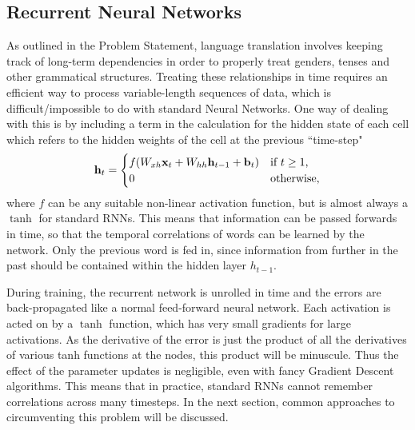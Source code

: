 \documentclass[]{article}
\begin{document}
\subsection{Recurrent Neural Networks}
As outlined in the Problem Statement, language translation involves keeping track of long-term dependencies in order to properly treat genders, tenses and other grammatical structures. Treating these relationships in time requires an efficient way to process variable-length sequences of data, which is difficult/impossible to do with standard Neural Networks. One way of dealing with this is by including a term in the calculation for the hidden state of each cell which refers to the hidden weights of the cell at the previous ``time-step"
\begin{equation}
\textbf{h}_t = 
\begin{cases}
f(W_{xh}\textbf{x}_t+W_{hh}\textbf{h}_{t-1}+\textbf{b}_t) & \textnormal{if $t \geq 1$,} \\
0  & \text{otherwise,} \\
\end{cases}
\end{equation}
where $f$ can be any suitable non-linear activation function, but is almost always a $\tanh$ for standard RNNs. This means that information can be passed forwards in time, so that the temporal correlations of words can be learned by the network. Only the previous word is fed in, since information from further in the past should be contained within the hidden layer $h_{t-1}$.

During training, the recurrent network is unrolled in time and the errors are back-propagated like a normal feed-forward neural network. Each activation is acted on by a $\tanh$ function, which has very small gradients for large activations. As the derivative of the error is just the product of all the derivatives of various tanh functions at the nodes, this product will be minuscule. Thus the effect of the parameter updates is negligible, even with fancy Gradient Descent algorithms. This means that in practice, standard RNNs cannot remember correlations across many timesteps. In the next section, common approaches to circumventing this problem will be discussed.
\end{document}
